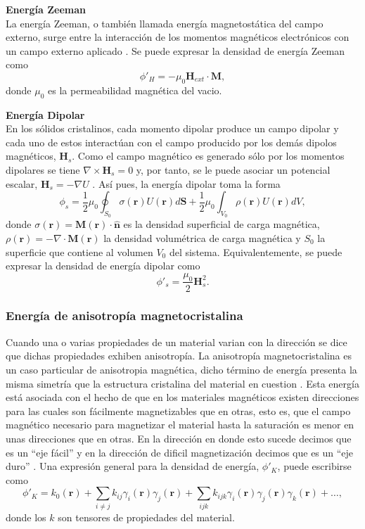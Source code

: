 \vspace{10pt}

\textbf{Energía Zeeman}\\
La energía Zeeman, o también llamada energía magnetostática del campo externo, surge entre la interacción de los momentos magnéticos electrónicos con un campo externo aplicado \cite{Exl2020}. Se puede expresar la densidad de energía Zeeman como \[ \phi'_H = - \mu_0 \mathbf{H}_{ext} \cdot \mathbf{M},\] donde $\mu_0$ es la permeabilidad magnética del vacio.

\vspace{10pt}


\textbf{Energía Dipolar}\\
En los sólidos cristalinos, cada momento dipolar produce un campo dipolar y cada uno de estos interactúan con el campo producido por los demás dipolos magnéticos, $\mathbf{H}_s$. Como el campo magnético es generado sólo por los momentos dipolares se tiene $\nabla \times \mathbf{H}_s = 0$ y, por tanto, se le puede asociar un potencial escalar, $\mathbf{H}_s = - \nabla U$ \cite{KronmüllerMicromagnetism}. Así pues, la energía dipolar toma la forma \[ \phi_s = \frac{1}{2} \mu_0 \oint_{S_0} \sigma(\mathbf{r}) U(\mathbf{r}) d \mathbf{S} + \frac{1}{2} \mu_0 \int_{V_0} \rho (\mathbf{r}) U(\mathbf{r}) dV ,\] donde $\sigma(\mathbf{r}) = \mathbf{M} (\mathbf{r}) \cdot \hat{\mathbf{n}}$ es la densidad superficial de carga magnética, $\rho(\mathbf{r}) = - \nabla \cdot \mathbf{M} (\mathbf{r})$ la densidad volumétrica de carga magnética y $S_0$ la superficie que contiene al volumen $V_0$ del sistema. Equivalentemente, se puede expresar la densidad de energía dipolar como \[ \phi'_s = \frac{\mu_0}{2} \mathbf{H}_s^2 .\]

\subsubsection{Energía de anisotropía magnetocristalina}
Cuando una o varias propiedades de un material varian con la dirección se dice que dichas propiedades exhiben anisotropía. La anisotropía magnetocristalina es un caso particular de anisotropia magnética, dicho término de energía presenta la misma simetría que la estructura cristalina del material en cuestion \cite{KronmüllerMicromagnetism}. Esta energía está asociada con el hecho de que en los materiales magnéticos existen direcciones para las cuales son fácilmente magnetizables que en otras, esto es, que el campo magnético necesario para magnetizar el material hasta la saturación es menor en unas direcciones que en otras. En la dirección en donde esto sucede decimos que es un ``eje fácil'' y en la dirección de dificil magnetización decimos que es un ``eje duro'' \cite{OHandley}. Una expresión general para la densidad de energía, $\phi'_K$, puede escribirse como \cite{birss1964symmetry} 
\begin{equation}
    \phi'_K = k_0 (\mathbf{r}) + \sum_{i \neq j} k_{ij} \gamma_i (\mathbf{r}) \gamma_j(\mathbf{r}) + \sum_{ijk} k_{ijk} \gamma_i (\mathbf{r}) \gamma_j (\mathbf{r}) \gamma_k (\mathbf{r}) + \dotsc,    \label{eq:anisotropy}
\end{equation}
donde los $k$ son tensores de propiedades del material.

